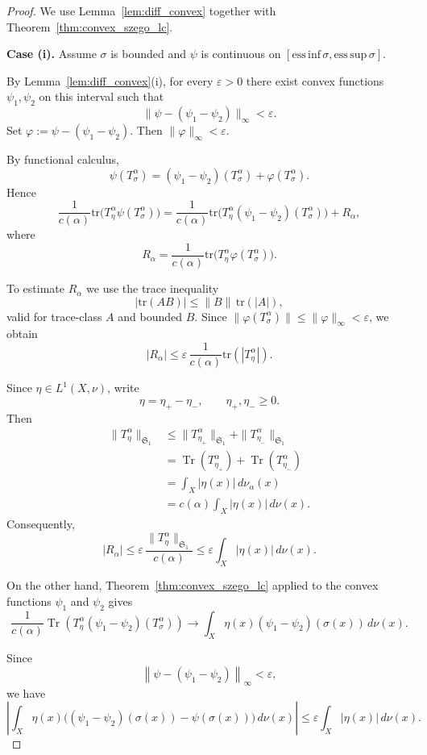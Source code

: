 \documentclass{amsart}
\theoremstyle{definition}
\theoremstyle{remark}
\numberwithin{equation}{section}
\newcommand{\tr}{\text{tr}} %
\newcommand{\calF}{\mathcal{F}}
\begin{document}
\begin{proof}
We use Lemma~\ref{lem:diff_convex} together with
Theorem~\ref{thm:convex_szego_lc}.

\medskip
\noindent
\textbf{Case (i).}
Assume $\sigma$ is bounded and $\psi$ is continuous on
$[\mathrm{ess\,inf}\,\sigma,\mathrm{ess\,sup}\,\sigma]$.

By Lemma~\ref{lem:diff_convex}(i), for every $\varepsilon>0$
there exist convex functions $\psi_1,\psi_2$ on this interval such that
\[
\|\psi-(\psi_1-\psi_2)\|_\infty < \varepsilon.
\]
Set $\varphi := \psi-(\psi_1-\psi_2)$.
Then $\|\varphi\|_\infty < \varepsilon$.

By functional calculus,
\[
\psi(T_\sigma^\alpha)
=
(\psi_1-\psi_2)(T_\sigma^\alpha)
+
\varphi(T_\sigma^\alpha).
\]
Hence
\[
\frac{1}{c(\alpha)}
\tr\!\big(T_\eta^\alpha \psi(T_\sigma^\alpha)\big)
=
\frac{1}{c(\alpha)}
\tr\!\big(T_\eta^\alpha (\psi_1-\psi_2)(T_\sigma^\alpha)\big)
+
R_\alpha,
\]
where
\[
R_\alpha
=
\frac{1}{c(\alpha)}
\tr\!\big(T_\eta^\alpha \varphi(T_\sigma^\alpha)\big).
\]

To estimate $R_\alpha$ we use the trace inequality
\[
|\tr(AB)| \le \|B\|\, \tr(|A|),
\]
valid for trace-class $A$ and bounded $B$.
Since $\|\varphi(T_\sigma^\alpha)\|
\le \|\varphi\|_\infty < \varepsilon$,
we obtain
\[
|R_\alpha|
\le
\varepsilon \,
\frac{1}{c(\alpha)} \tr(|T_\eta^\alpha|).
\]

Since $\eta\in L^1(X,\nu)$, write
\[
\eta=\eta_+-\eta_-,
\qquad
\eta_+,\eta_-\geq0.
\]
Then
\[
\begin{aligned}
\|T_\eta^\alpha\|_{\mathfrak S_1}
&\leq
\|T_{\eta_+}^\alpha\|_{\mathfrak S_1}
+
\|T_{\eta_-}^\alpha\|_{\mathfrak S_1}\\
&=
\operatorname{Tr}(T_{\eta_+}^\alpha)
+
\operatorname{Tr}(T_{\eta_-}^\alpha)\\
&=
\int_X|\eta(x)|\,d\nu_\alpha(x)\\
&=
c(\alpha)\int_X|\eta(x)|\,d\nu(x).
\end{aligned}
\]
Consequently,
\[
|R_\alpha|
\leq
\varepsilon\,
\frac{\|T_\eta^\alpha\|_{\mathfrak S_1}}{c(\alpha)}
\leq
\varepsilon\int_X|\eta(x)|\,d\nu(x).
\]

On the other hand, Theorem~\ref{thm:convex_szego_lc} applied to the convex functions
$\psi_1$ and $\psi_2$ gives
\[
\frac{1}{c(\alpha)}
\operatorname{Tr}\!\left(
T_\eta^\alpha
(\psi_1-\psi_2)(T_\sigma^\alpha)
\right)
\longrightarrow
\int_X
\eta(x)(\psi_1-\psi_2)(\sigma(x))
\,d\nu(x).
\]

Since
\[
\left\|
\psi-(\psi_1-\psi_2)
\right\|_\infty<\varepsilon,
\]
we have
\[
\left|
\int_X
\eta(x)
\bigl((\psi_1-\psi_2)(\sigma(x))-\psi(\sigma(x))\bigr)
\,d\nu(x)
\right|
\leq
\varepsilon\int_X|\eta(x)|\,d\nu(x).
\]


\end{proof}
\end{document}
